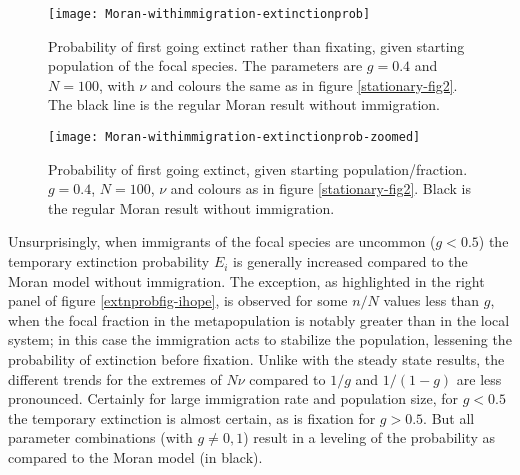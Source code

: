\begin{figure}[ht]
	\centering
	\texttt{[image: Moran-withimmigration-extinctionprob]}
	\caption{Probability of first going extinct rather than fixating, given starting population of the focal species. The parameters are $g=0.4$ and $N=100$, with $\nu$ and colours the same as in figure \ref{stationary-fig2}. The black line is the regular Moran result without immigration. } \label{extnprobfig}
\end{figure}
\begin{figure}[ht]
	\centering
	\texttt{[image: Moran-withimmigration-extinctionprob-zoomed]}
	\caption{Probability of first going extinct, given starting population/fraction. $g=0.4$, $N=100$, $\nu$ and colours as in figure \ref{stationary-fig2}. Black is the regular Moran result without immigration. }
\end{figure}
\fi

Unsurprisingly, when immigrants of the focal species are uncommon ($g<0.5$) the temporary extinction probability $E_i$ is generally increased compared to the Moran model without immigration. 
The exception, as highlighted in the right panel of figure \ref{extnprobfig-ihope}, is observed for some $n/N$ values less than $g$, when the focal fraction in the metapopulation is notably greater than in the local system; in this case the immigration acts to stabilize the population, lessening the probability of extinction before fixation. %
Unlike with the steady state results, the different trends for the extremes of $N\nu$ compared to $1/g$ and $1/(1-g)$ are less pronounced. 
Certainly for large immigration rate and population size, for $g<0.5$ the temporary extinction is almost certain, as is fixation for $g>0.5$. 
But all parameter combinations (with $g\neq 0,1$) result in a leveling of the probability as compared to the Moran model (in black). %

